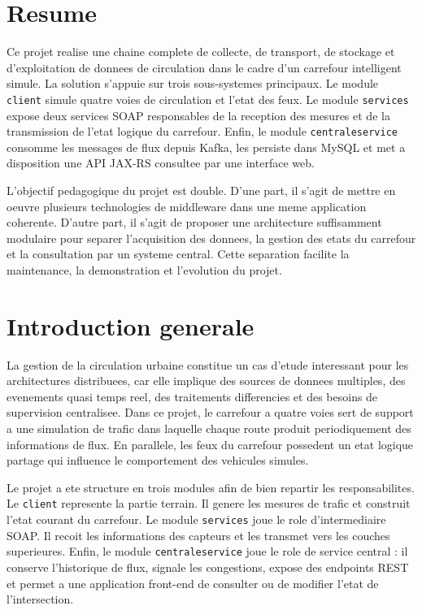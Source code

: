 \documentclass[12pt,a4paper]{report}
\begin{document}
\chapter*{Resume}
Ce projet realise une chaine complete de collecte, de transport, de stockage et d'exploitation de donnees de circulation dans le cadre d'un carrefour intelligent simule. La solution s'appuie sur trois sous-systemes principaux. Le module \texttt{client} simule quatre voies de circulation et l'etat des feux. Le module \texttt{services} expose deux services SOAP responsables de la reception des mesures et de la transmission de l'etat logique du carrefour. Enfin, le module \texttt{centraleservice} consomme les messages de flux depuis Kafka, les persiste dans MySQL et met a disposition une API JAX-RS consultee par une interface web.

L'objectif pedagogique du projet est double. D'une part, il s'agit de mettre en oeuvre plusieurs technologies de middleware dans une meme application coherente. D'autre part, il s'agit de proposer une architecture suffisamment modulaire pour separer l'acquisition des donnees, la gestion des etats du carrefour et la consultation par un systeme central. Cette separation facilite la maintenance, la demonstration et l'evolution du projet.

\chapter{Introduction generale}
La gestion de la circulation urbaine constitue un cas d'etude interessant pour les architectures distribuees, car elle implique des sources de donnees multiples, des evenements quasi temps reel, des traitements differencies et des besoins de supervision centralisee. Dans ce projet, le carrefour a quatre voies sert de support a une simulation de trafic dans laquelle chaque route produit periodiquement des informations de flux. En parallele, les feux du carrefour possedent un etat logique partage qui influence le comportement des vehicules simules.

Le projet a ete structure en trois modules afin de bien repartir les responsabilites. Le \texttt{client} represente la partie terrain. Il genere les mesures de trafic et construit l'etat courant du carrefour. Le module \texttt{services} joue le role d'intermediaire SOAP. Il recoit les informations des capteurs et les transmet vers les couches superieures. Enfin, le module \texttt{centraleservice} joue le role de service central : il conserve l'historique de flux, signale les congestions, expose des endpoints REST et permet a une application front-end de consulter ou de modifier l'etat de l'intersection.
\end{document}

